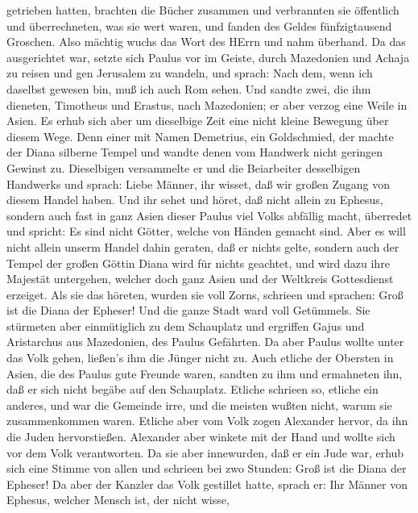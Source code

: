 getrieben hatten, brachten die Bücher zusammen und verbrannten sie
öffentlich und überrechneten, was sie wert waren, und fanden des Geldes
fünfzigtausend Groschen.  Also mächtig wuchs das Wort des
HErrn und nahm überhand.  Da das ausgerichtet war, setzte
sich Paulus vor im Geiste, durch Mazedonien und Achaja zu reisen und gen
Jerusalem zu wandeln, und sprach: Nach dem, wenn ich daselbst gewesen
bin, muß ich auch Rom sehen.  Und sandte zwei, die ihm
dieneten, Timotheus und Erastus, nach Mazedonien; er aber verzog eine
Weile in Asien.  Es erhub sich aber um dieselbige Zeit eine
nicht kleine Bewegung über diesem Wege.  Denn einer mit
Namen Demetrius, ein Goldschmied, der machte der Diana silberne Tempel
und wandte denen vom Handwerk nicht geringen Gewinst zu. 
Dieselbigen versammelte er und die Beiarbeiter desselbigen Handwerks und
sprach: Liebe Männer, ihr wisset, daß wir großen Zugang von diesem
Handel haben.  Und ihr sehet und höret, daß nicht allein zu
Ephesus, sondern auch fast in ganz Asien dieser Paulus viel Volks
abfällig macht, überredet und spricht: Es sind nicht Götter, welche von
Händen gemacht sind.  Aber es will nicht allein unserm
Handel dahin geraten, daß er nichts gelte, sondern auch der Tempel der
großen Göttin Diana wird für nichts geachtet, und wird dazu ihre
Majestät untergehen, welcher doch ganz Asien und der Weltkreis
Gottesdienst erzeiget.  Als sie das höreten, wurden sie
voll Zorns, schrieen und sprachen: Groß ist die Diana der Epheser!
 Und die ganze Stadt ward voll Getümmels. Sie stürmeten
aber einmütiglich zu dem Schauplatz und ergriffen Gajus und Aristarchus
aus Mazedonien, des Paulus Gefährten.  Da aber Paulus
wollte unter das Volk gehen, ließen's ihm die Jünger nicht zu.
 Auch etliche der Obersten in Asien, die des Paulus gute
Freunde waren, sandten zu ihm und ermahneten ihn, daß er sich nicht
begäbe auf den Schauplatz.  Etliche schrieen so, etliche
ein anderes, und war die Gemeinde irre, und die meisten wußten nicht,
warum sie zusammenkommen waren.  Etliche aber vom Volk
zogen Alexander hervor, da ihn die Juden hervorstießen. Alexander aber
winkete mit der Hand und wollte sich vor dem Volk verantworten.
 Da sie aber innewurden, daß er ein Jude war, erhub sich
eine Stimme von allen und schrieen bei zwo Stunden: Groß ist die Diana
der Epheser!  Da aber der Kanzler das Volk gestillet hatte,
sprach er: Ihr Männer von Ephesus, welcher Mensch ist, der nicht wisse,
